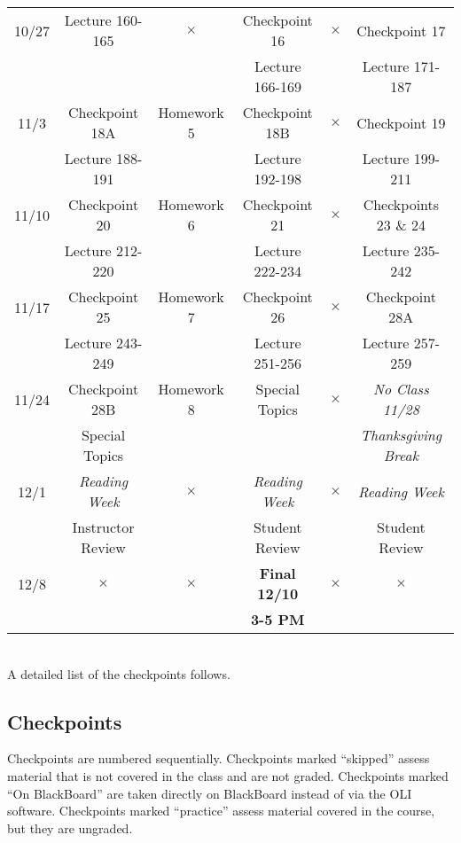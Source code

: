 \documentclass[10pt]{article}
\begin{document}
\begin{tabular}{c|c|c|c|c|c}
10/27  & Lecture 160-165 & $\times$  & Checkpoint 16 & $\times$ &  Checkpoint 17  \\
       &             &           & Lecture 166-169    &  &  Lecture 171-187    \\
\hline 
11/3   & Checkpoint 18A & Homework 5 & Checkpoint 18B & $\times$ &  Checkpoint 19  \\
       & Lecture 188-191   &            & Lecture 192-198   &  &  Lecture 199-211    \\
\hline 
11/10  & Checkpoint 20 & Homework 6 & Checkpoint 21 & $\times$ & Checkpoints 23 \& 24  \\
       & Lecture 212-220   &            & Lecture 222-234   &  &  Lecture 235-242    \\
\hline 
11/17  & Checkpoint 25 & Homework 7 & Checkpoint 26 & $\times$ &
Checkpoint 28A  \\
       & Lecture 243-249   &            & Lecture 251-256   &  &  Lecture 257-259    \\
\hline 
11/24  & Checkpoint 28B   & Homework 8 & Special Topics & $\times$ &
{\em No Class 11/28} \\
       & Special Topics                &            &                &
&  {\em Thanksgiving Break}   \\
\hline 
12/1  & {\em Reading Week}  & $\times$ &  {\em Reading Week} &
$\times$ & {\em Reading Week} \\
      & Instructor Review &        & Student Review  &  & Student Review  \\
\hline
12/8  & $\times$ & $\times$ & {\bfseries Final 12/10} & $\times$ &  $\times$ \\
      &          &          & {\bfseries 3-5 PM} & & \\ 
\hline
\end{tabular} \\

A detailed list of the checkpoints follows. 

\break 
\subsection*{Checkpoints}
Checkpoints are numbered sequentially. Checkpoints marked ``skipped''
assess material that is not covered in the class and are not
graded. Checkpoints marked ``On BlackBoard'' are taken directly on
BlackBoard instead of via the OLI software. Checkpoints marked
``practice'' assess material covered in the course, but they are ungraded. \\
\end{document}
